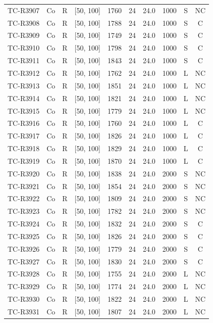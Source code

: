 \begin{longtable}{lccccccccc}
TC-R3907 & Co & R & [50, 100] & 1760 & 24 & 24.0 & 1000 & S & NC \\
TC-R3908 & Co & R & [50, 100] & 1788 & 24 & 24.0 & 1000 & S & C \\
TC-R3909 & Co & R & [50, 100] & 1749 & 24 & 24.0 & 1000 & S & C \\
TC-R3910 & Co & R & [50, 100] & 1798 & 24 & 24.0 & 1000 & S & C \\
TC-R3911 & Co & R & [50, 100] & 1843 & 24 & 24.0 & 1000 & S & C \\
TC-R3912 & Co & R & [50, 100] & 1762 & 24 & 24.0 & 1000 & L & NC \\
TC-R3913 & Co & R & [50, 100] & 1851 & 24 & 24.0 & 1000 & L & NC \\
TC-R3914 & Co & R & [50, 100] & 1821 & 24 & 24.0 & 1000 & L & NC \\
TC-R3915 & Co & R & [50, 100] & 1779 & 24 & 24.0 & 1000 & L & NC \\
TC-R3916 & Co & R & [50, 100] & 1760 & 24 & 24.0 & 1000 & L & C \\
TC-R3917 & Co & R & [50, 100] & 1826 & 24 & 24.0 & 1000 & L & C \\
TC-R3918 & Co & R & [50, 100] & 1829 & 24 & 24.0 & 1000 & L & C \\
TC-R3919 & Co & R & [50, 100] & 1870 & 24 & 24.0 & 1000 & L & C \\
TC-R3920 & Co & R & [50, 100] & 1838 & 24 & 24.0 & 2000 & S & NC \\
TC-R3921 & Co & R & [50, 100] & 1854 & 24 & 24.0 & 2000 & S & NC \\
TC-R3922 & Co & R & [50, 100] & 1809 & 24 & 24.0 & 2000 & S & NC \\
TC-R3923 & Co & R & [50, 100] & 1782 & 24 & 24.0 & 2000 & S & NC \\
TC-R3924 & Co & R & [50, 100] & 1832 & 24 & 24.0 & 2000 & S & C \\
TC-R3925 & Co & R & [50, 100] & 1826 & 24 & 24.0 & 2000 & S & C \\
TC-R3926 & Co & R & [50, 100] & 1779 & 24 & 24.0 & 2000 & S & C \\
TC-R3927 & Co & R & [50, 100] & 1830 & 24 & 24.0 & 2000 & S & C \\
TC-R3928 & Co & R & [50, 100] & 1755 & 24 & 24.0 & 2000 & L & NC \\
TC-R3929 & Co & R & [50, 100] & 1774 & 24 & 24.0 & 2000 & L & NC \\
TC-R3930 & Co & R & [50, 100] & 1822 & 24 & 24.0 & 2000 & L & NC \\
TC-R3931 & Co & R & [50, 100] & 1807 & 24 & 24.0 & 2000 & L & NC \\

\end{longtable}
